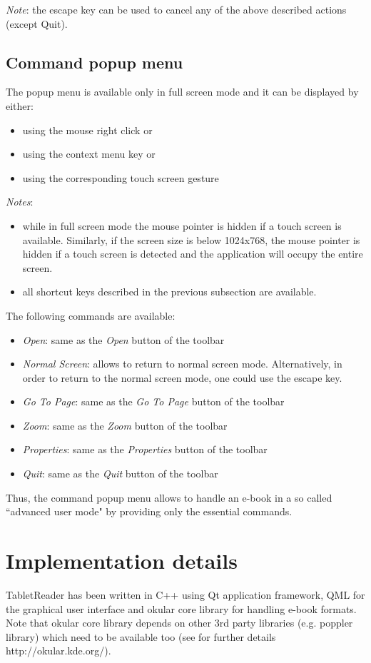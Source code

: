 \documentclass[journal,12pt]{IEEEtran}
\begin{document}
\textit{Note}: the escape key can be used to cancel any of the above described actions (except Quit).

\subsection{Command popup menu}
The popup menu is available only in full screen mode and it can be displayed by either:
\begin{itemize}
 \item using the mouse right click or
 \item using the context menu key or
 \item using the corresponding touch screen gesture
\end{itemize}

\textit{Notes}: 
\begin{itemize}
 \item while in full screen mode the mouse pointer is hidden if a touch screen is available. Similarly, if the screen size is below 1024x768, the mouse pointer is hidden if a touch screen is detected and the application will occupy the entire screen.
 \item all shortcut keys described in the previous subsection are available.
\end{itemize}

The following commands are available:
\begin{itemize}
 \item \textit{Open}: same as the \textit{Open} button of the toolbar
 \item \textit{Normal Screen}: allows to return to normal screen mode. Alternatively, in order to return to the normal screen mode, one could use the escape key.
 \item \textit{Go To Page}: same as the \textit{Go To Page} button of the toolbar
 \item \textit{Zoom}: same as the \textit{Zoom} button of the toolbar
 \item \textit{Properties}: same as the \textit{Properties} button of the toolbar
 \item \textit{Quit}: same as the \textit{Quit} button of the toolbar
\end{itemize}
Thus, the command popup menu allows to handle an e-book in a so called ``advanced user mode" by providing only the essential commands.

\section{Implementation details}
TabletReader has been written in C++ using Qt application framework, QML for the graphical user interface and okular core library for handling e-book formats. Note that okular core library depends on other 3rd party libraries (e.g. poppler library) which need to be available too (see for further details http://okular.kde.org/).
\end{document}
